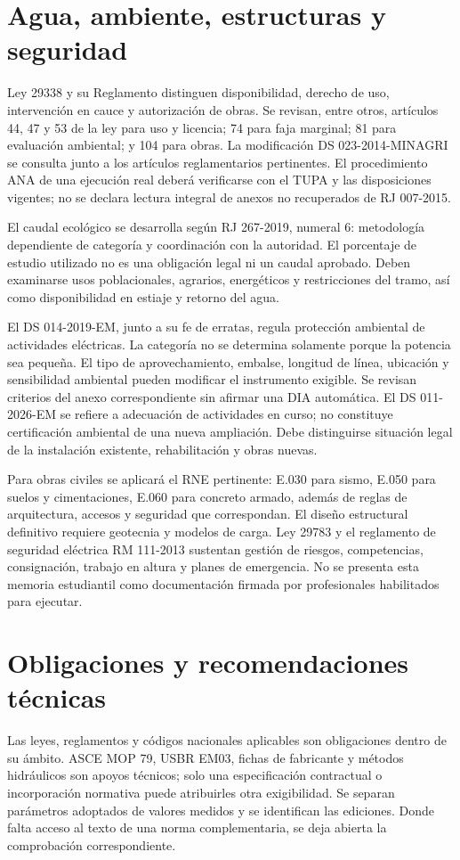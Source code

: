 \section{Agua, ambiente, estructuras y seguridad}
Ley 29338 y su Reglamento distinguen disponibilidad, derecho de uso, intervención en cauce y autorización de obras. Se revisan, entre otros, artículos 44, 47 y 53 de la ley para uso y licencia; 74 para faja marginal; 81 para evaluación ambiental; y 104 para obras. La modificación DS 023-2014-MINAGRI se consulta junto a los artículos reglamentarios pertinentes. El procedimiento ANA de una ejecución real deberá verificarse con el TUPA y las disposiciones vigentes; no se declara lectura integral de anexos no recuperados de RJ 007-2015.

El caudal ecológico se desarrolla según RJ 267-2019, numeral 6: metodología dependiente de categoría y coordinación con la autoridad. El porcentaje de estudio utilizado no es una obligación legal ni un caudal aprobado. Deben examinarse usos poblacionales, agrarios, energéticos y restricciones del tramo, así como disponibilidad en estiaje y retorno del agua.

El DS 014-2019-EM, junto a su fe de erratas, regula protección ambiental de actividades eléctricas. La categoría no se determina solamente porque la potencia sea pequeña. El tipo de aprovechamiento, embalse, longitud de línea, ubicación y sensibilidad ambiental pueden modificar el instrumento exigible. Se revisan criterios del anexo correspondiente sin afirmar una DIA automática. El DS 011-2026-EM se refiere a adecuación de actividades en curso; no constituye certificación ambiental de una nueva ampliación. Debe distinguirse situación legal de la instalación existente, rehabilitación y obras nuevas.

Para obras civiles se aplicará el RNE pertinente: E.030 para sismo, E.050 para suelos y cimentaciones, E.060 para concreto armado, además de reglas de arquitectura, accesos y seguridad que correspondan. El diseño estructural definitivo requiere geotecnia y modelos de carga. Ley 29783 y el reglamento de seguridad eléctrica RM 111-2013 sustentan gestión de riesgos, competencias, consignación, trabajo en altura y planes de emergencia. No se presenta esta memoria estudiantil como documentación firmada por profesionales habilitados para ejecutar.

\section{Obligaciones y recomendaciones técnicas}
Las leyes, reglamentos y códigos nacionales aplicables son obligaciones dentro de su ámbito. ASCE MOP 79, USBR EM03, fichas de fabricante y métodos hidráulicos son apoyos técnicos; solo una especificación contractual o incorporación normativa puede atribuirles otra exigibilidad. Se separan parámetros adoptados de valores medidos y se identifican las ediciones. Donde falta acceso al texto de una norma complementaria, se deja abierta la comprobación correspondiente.

